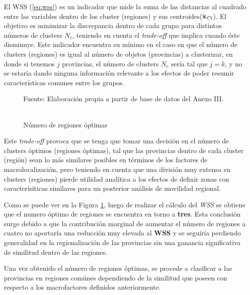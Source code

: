 \documentclass[12pt,a4paper]{article}
\begin{document}
El WSS (\ref{eq:wss}) es un indicador que mide la suma de las distancias al cuadrado entre las variables dentro de  los cluster (regiones) y sus centroides($\bar{\textbf{x}}_{\tiny{\textit{Ci}}}$). El objetivo es minimizar la discrepancia dentro de cada grupo para distintos números de clusters $N_c$, teniendo en cuenta el \textit{trade-off} que implica cuando éste disminuye. Este indicador encuentra su mínimo en el caso en que el número de clusters (regiones) es igual al número de objetos (provincias) a clusterizar, en donde si tenemos $j$ provincias, el número de clusters $N_c$ sería tal que $j=k$, y no se estaría dando ninguna información relevante a los efectos de poder resumir características comunes entre los grupos. 

\begin{figure}[htp!]
\begin{center}
	\caption{\\Número de regiones óptimas}
 	
	\label{figure:optimas}
\end{center}
\begin{flushleft}
\begin{scriptsize}
Fuente: Elaboración propia a partir de base de datos del Anexo III.\\
\end{scriptsize}
\end{flushleft}
\end{figure}
\newpage
Este \textit{trade-off} provoca que se tenga que tomar una decisión en el número de clusters óptimos (regiones óptimas), tal que las provincias dentro de cada cluster (región) sean lo más similares posibles en términos de los factores de macrolocalización, pero teniendo en cuenta que una división muy extensa en clusters (regiones) pierde utilidad analítica a los efectos de definir zonas con caracterísiticas similares para un posterior análisis de movilidad regional.

Como se puede ver en la Figura \ref{figure:optimas}, luego de realizar el cálculo del \textit{WSS} se obtiene que el numero óptimo de regiones se encuentra en torno a \textbf{tres}. Esta conclusión surge debido a que la contribución marginal de aumentar el número de regiones a cuatro no aportaría una reducción muy elevada al \textbf{WSS} y se seguiría perdiendo generalidad en la regionalización de las provincias sin una ganancia significativa de similitud dentro de las regiones.

Una vez obtenido el número de regiones óptimas, se procede a clasificar a las provincias en regiones comúnes dependiendo de la similitud que poseen con respecto a los macrofactores definidos anteriormente.
\end{document}
